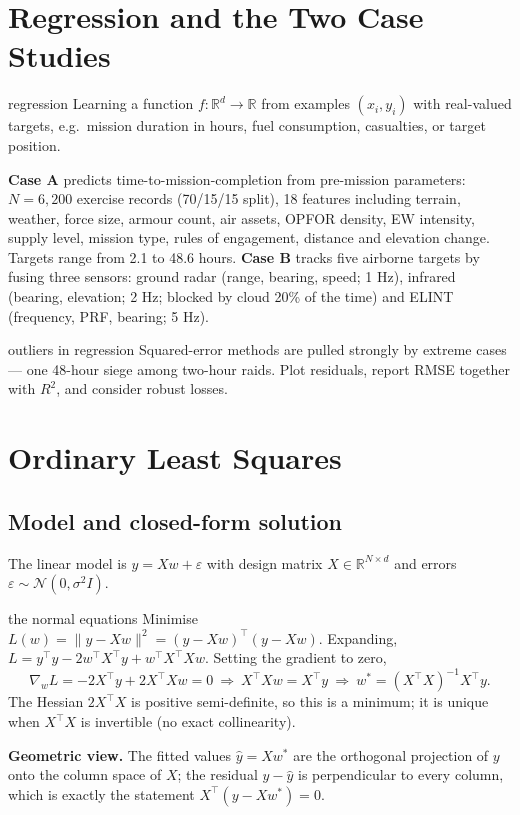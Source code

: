 \documentclass[11pt]{article}
\begin{document}
\tableofcontents
\newpage

\section{Regression and the Two Case Studies}
\begin{definition}{regression}
Learning a function $f:\mathbb R^d\to\mathbb R$ from examples $(x_i,y_i)$ with real-valued targets, e.g.\ mission duration in hours, fuel consumption, casualties, or target position.
\end{definition}
\textbf{Case A} predicts time-to-mission-completion from pre-mission parameters: $N=6{,}200$ exercise records (70/15/15 split), 18 features including terrain, weather, force size, armour count, air assets, OPFOR density, EW intensity, supply level, mission type, rules of engagement, distance and elevation change. Targets range from 2.1 to 48.6 hours. \textbf{Case B} tracks five airborne targets by fusing three sensors: ground radar (range, bearing, speed; 1 Hz), infrared (bearing, elevation; 2 Hz; blocked by cloud 20\% of the time) and ELINT (frequency, PRF, bearing; 5 Hz).

\begin{pitfall}{outliers in regression}
Squared-error methods are pulled strongly by extreme cases --- one 48-hour siege among two-hour raids. Plot residuals, report RMSE together with $R^2$, and consider robust losses.
\end{pitfall}

\section{Ordinary Least Squares}
\subsection{Model and closed-form solution}
The linear model is $y=Xw+\varepsilon$ with design matrix $X\in\mathbb R^{N\times d}$ and errors $\varepsilon\sim\mathcal N(0,\sigma^2I)$.
\begin{derivation}{the normal equations}
Minimise $L(w)=\|y-Xw\|^2=(y-Xw)^\top(y-Xw)$. Expanding, $L=y^\top y-2w^\top X^\top y+w^\top X^\top Xw$. Setting the gradient to zero,
\[\nabla_wL=-2X^\top y+2X^\top Xw=0\ \Rightarrow\ X^\top Xw=X^\top y\ \Rightarrow\ \boxed{w^*=(X^\top X)^{-1}X^\top y}.\]
The Hessian $2X^\top X$ is positive semi-definite, so this is a minimum; it is unique when $X^\top X$ is invertible (no exact collinearity).
\end{derivation}
\textbf{Geometric view.} The fitted values $\hat y=Xw^*$ are the orthogonal projection of $y$ onto the column space of $X$; the residual $y-\hat y$ is perpendicular to every column, which is exactly the statement $X^\top(y-Xw^*)=0$.
\end{document}
